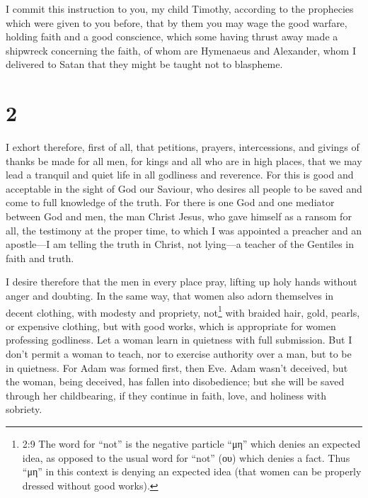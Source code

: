  I commit this instruction to you, my child Timothy,
according to the prophecies which were given to you before, that by them
you may wage the good warfare,  holding faith and a good
conscience, which some having thrust away made a shipwreck concerning
the faith,  of whom are Hymenaeus and Alexander, whom I
delivered to Satan that they might be taught not to blaspheme.

\hypertarget{section-1}{%
\section{2}\label{section-1}}

 I exhort therefore, first of all, that petitions, prayers,
intercessions, and givings of thanks be made for all men, 
for kings and all who are in high places, that we may lead a tranquil
and quiet life in all godliness and reverence.  For this is
good and acceptable in the sight of God our Saviour,  who
desires all people to be saved and come to full knowledge of the truth.
 For there is one God and one mediator between God and men,
the man Christ Jesus,  who gave himself as a ransom for all,
the testimony at the proper time,  to which I was appointed
a preacher and an apostle---I am telling the truth in Christ, not
lying---a teacher of the Gentiles in faith and truth.

 I desire therefore that the men in every place pray,
lifting up holy hands without anger and doubting.  In the
same way, that women also adorn themselves in decent clothing, with
modesty and propriety, not\footnote{2:9 The word for ``not'' is the
  negative particle ``μη'' which denies an expected idea, as opposed to
  the usual word for ``not'' (ου) which denies a fact. Thus ``μη'' in
  this context is denying an expected idea (that women can be properly
  dressed without good works).} with braided hair, gold, pearls, or
expensive clothing,  but with good works, which is
appropriate for women professing godliness.  Let a woman
learn in quietness with full submission.  But I don't
permit a woman to teach, nor to exercise authority over a man, but to be
in quietness.  For Adam was formed first, then Eve.
 Adam wasn't deceived, but the woman, being deceived, has
fallen into disobedience;  but she will be saved through
her childbearing, if they continue in faith, love, and holiness with
sobriety.

